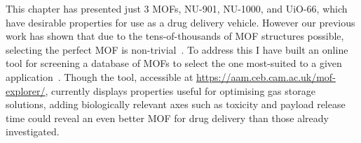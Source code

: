 This chapter has presented just 3 MOFs, NU-901, NU-1000, and UiO-66, which have desirable properties for use as a drug delivery vehicle. 
However our previous work has shown that due to the tens-of-thousands of MOF structures possible, selecting the perfect MOF is non-trivial~\cite{moghadam2018computer}. 
To address this I have built an online tool for screening a database of MOFs to select the one most-suited to a given application~\cite{moghadam2018computer}. 
Though the tool, accessible at \url{https://aam.ceb.cam.ac.uk/mof-explorer/}, currently displays properties useful for optimising gas storage solutions, adding biologically relevant axes such as toxicity and payload release time could reveal an even better MOF for drug delivery than those already investigated. 